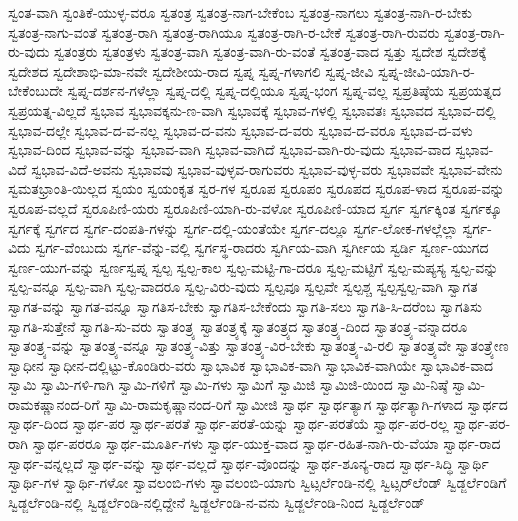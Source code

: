 {ಸ್ವಂತ-ವಾಗಿ
ಸ್ವಂತಿಕೆ-ಯುಳ್ಳ-ವರೂ
ಸ್ವತಂತ್ರ
ಸ್ವತಂತ್ರ-ನಾಗ-ಬೇಕೆಂಬ
ಸ್ವತಂತ್ರ-ನಾಗಲು
ಸ್ವತಂತ್ರ-ನಾಗಿ-ರ-ಬೇಕು
ಸ್ವತಂತ್ರ-ನಾಗು-ವಂತೆ
ಸ್ವತಂತ್ರ-ರಾಗಿ
ಸ್ವತಂತ್ರ-ರಾಗಿಯೂ
ಸ್ವತಂತ್ರ-ರಾಗಿ-ರ-ಬೇಕೆ
ಸ್ವತಂತ್ರ-ರಾಗಿ-ರುವರು
ಸ್ವತಂತ್ರ-ರಾಗಿ-ರು-ವುದು
ಸ್ವತಂತ್ರರು
ಸ್ವತಂತ್ರಳು
ಸ್ವತಂತ್ರ-ವಾಗಿ
ಸ್ವತಂತ್ರ-ವಾಗಿ-ರು-ವಂತೆ
ಸ್ವತಂತ್ರ-ವಾದ
ಸ್ವತ್ತು
ಸ್ವದೇಶ
ಸ್ವದೇಶಕ್ಕೆ
ಸ್ವದೇಶದ
ಸ್ವದೇಶಾಭಿ-ಮಾ-ನವೇ
ಸ್ವದೇಶೀಯ-ರಾದ
ಸ್ವಪ್ನ
ಸ್ವಪ್ನ-ಗಳಾಗಲಿ
ಸ್ವಪ್ನ-ಜೀವಿ
ಸ್ವಪ್ನ-ಜೀವಿ-ಯಾಗಿ-ರ-ಬೇಕೆಂಬುದೇ
ಸ್ವಪ್ನ-ದರ್ಶನ-ಗಳೆಲ್ಲಾ
ಸ್ವಪ್ನ-ದಲ್ಲಿ
ಸ್ವಪ್ನ-ದಲ್ಲಿಯೂ
ಸ್ವಪ್ನ-ಭಂಗ
ಸ್ವಪ್ನ-ವಲ್ಲ
ಸ್ವಪ್ರತಿಷ್ಠೆಯ
ಸ್ವಪ್ರಯತ್ನದ
ಸ್ವಪ್ರಯತ್ನ-ವಿಲ್ಲದೆ
ಸ್ವಭಾವ
ಸ್ವಭಾವಕ್ಕನು-ಣ-ವಾಗಿ
ಸ್ವಭಾವಕ್ಕೆ
ಸ್ವಭಾವ-ಗಳಲ್ಲಿ
ಸ್ವಭಾವತಃ
ಸ್ವಭಾವದ
ಸ್ವಭಾವ-ದಲ್ಲಿ
ಸ್ವಭಾವ-ದಲ್ಲೇ
ಸ್ವಭಾವ-ದ-ವ-ನಲ್ಲ
ಸ್ವಭಾವ-ದ-ವನು
ಸ್ವಭಾವ-ದ-ವರು
ಸ್ವಭಾವ-ದ-ವರೂ
ಸ್ವಭಾವ-ದ-ವಳು
ಸ್ವಭಾವ-ದಿಂದ
ಸ್ವಭಾವ-ವನ್ನು
ಸ್ವಭಾವ-ವಾಗಿ
ಸ್ವಭಾವ-ವಾಗಿದೆ
ಸ್ವಭಾವ-ವಾಗಿ-ರು-ವುದು
ಸ್ವಭಾವ-ವಾದ
ಸ್ವಭಾವ-ವಿದೆ
ಸ್ವಭಾವ-ವಿದೆ-ಅವನು
ಸ್ವಭಾವವು
ಸ್ವಭಾವ-ವುಳ್ಳವ-ರಾಗುವರು
ಸ್ವಭಾವ-ವುಳ್ಳ-ವರು
ಸ್ವಭಾವವೇ
ಸ್ವಭಾವ-ವೇನು
ಸ್ವಮತಭ್ರಾಂತಿ-ಯಿಲ್ಲದ
ಸ್ವಯಂ
ಸ್ವಯಂಕೃತ
ಸ್ವರ-ಗಳ
ಸ್ವರೂಪ
ಸ್ವರೂಪಂ
ಸ್ವರೂಪದ
ಸ್ವರೂಪ-ಳಾದ
ಸ್ವರೂಪ-ವನ್ನು
ಸ್ವರೂಪ-ವಲ್ಲದೆ
ಸ್ವರೂಪಿಣಿ-ಯರು
ಸ್ವರೂಪಿಣಿ-ಯಾಗಿ-ರು-ವಳೋ
ಸ್ವರೂಪಿಣಿ-ಯಾದ
ಸ್ವರ್ಗ
ಸ್ವರ್ಗಕ್ಕಿಂತ
ಸ್ವರ್ಗಕ್ಕೂ
ಸ್ವರ್ಗಕ್ಕೆ
ಸ್ವರ್ಗದ
ಸ್ವರ್ಗ-ದಂಪತಿ-ಗಳನ್ನು
ಸ್ವರ್ಗ-ದಲ್ಲಿ-ಯಂತೆಯೇ
ಸ್ವರ್ಗ-ದಲ್ಲೂ
ಸ್ವರ್ಗ-ಲೋಕ-ಗಳಲ್ಲೆಲ್ಲಾ
ಸ್ವರ್ಗ-ವಿದು
ಸ್ವರ್ಗ-ವೆಂಬುದು
ಸ್ವರ್ಗ-ವೆನ್ನು-ವಲ್ಲಿ
ಸ್ವರ್ಗಸ್ಥ-ರಾದರು
ಸ್ವರ್ಗಿಯ-ವಾಗಿ
ಸ್ವರ್ಗೀಯ
ಸ್ವರ್ಡಿ
ಸ್ವರ್ಣ-ಯುಗದ
ಸ್ವರ್ಣ-ಯುಗ-ವನ್ನು
ಸ್ವರ್ಣಸ್ವಪ್ನ
ಸ್ವಲ್ಪ
ಸ್ವಲ್ಪ-ಕಾಲ
ಸ್ವಲ್ಪ-ಮಟ್ಟಿ-ಗಾ-ದರೂ
ಸ್ವಲ್ಪ-ಮಟ್ಟಿಗೆ
ಸ್ವಲ್ಪ-ಮಪ್ಯಸ್ಯ
ಸ್ವಲ್ಪ-ವನ್ನು
ಸ್ವಲ್ಪ-ವನ್ನೂ
ಸ್ವಲ್ಪ-ವಾಗಿ
ಸ್ವಲ್ಪ-ವಾದರೂ
ಸ್ವಲ್ಪ-ವಿರು-ವುದು
ಸ್ವಲ್ಪವೂ
ಸ್ವಲ್ಪವೇ
ಸ್ವಲ್ಪಶ್ಚ
ಸ್ವಲ್ಪಸ್ವಲ್ಪ-ವಾಗಿ
ಸ್ವಾಗತ
ಸ್ವಾಗತ-ವನ್ನು
ಸ್ವಾಗತ-ವನ್ನೂ
ಸ್ವಾಗತಿಸ-ಬೇಕು
ಸ್ವಾಗತಿಸ-ಬೇಕೆಂದು
ಸ್ವಾಗತಿ-ಸಲು
ಸ್ವಾಗತಿ-ಸಿ-ದರೆಂಬ
ಸ್ವಾಗತಿಸು
ಸ್ವಾಗತಿ-ಸುತ್ತೇನೆ
ಸ್ವಾಗತಿ-ಸು-ವರು
ಸ್ವಾತಂತ್ರ್ಯ
ಸ್ವಾತಂತ್ರ್ಯಕ್ಕೆ
ಸ್ವಾತಂತ್ರ್ಯದ
ಸ್ವಾತಂತ್ರ್ಯ-ದಿಂದ
ಸ್ವಾತಂತ್ರ್ಯ-ವನ್ನಾದರೂ
ಸ್ವಾತಂತ್ರ್ಯ-ವನ್ನು
ಸ್ವಾತಂತ್ರ್ಯ-ವನ್ನೂ
ಸ್ವಾತಂತ್ರ್ಯ-ವಿತ್ತು
ಸ್ವಾತಂತ್ರ್ಯ-ವಿರ-ಬೇಕು
ಸ್ವಾತಂತ್ರ್ಯ-ವಿ-ರಲಿ
ಸ್ವಾತಂತ್ರ್ಯವೇ
ಸ್ವಾತಂತ್ರ್ಯೇಣ
ಸ್ವಾಧೀನ
ಸ್ವಾಧೀನ-ದಲ್ಲಿಟ್ಟು-ಕೊಂಡಿರು-ವರು
ಸ್ವಾಭಾವಿಕ
ಸ್ವಾಭಾವಿಕ-ವಾಗಿ
ಸ್ವಾಭಾವಿಕ-ವಾಗಿಯೇ
ಸ್ವಾಭಾವಿಕ-ವಾದ
ಸ್ವಾಮಿ
ಸ್ವಾಮಿ-ಗಳಿ-ಗಾಗಿ
ಸ್ವಾಮಿ-ಗಳಿಗೆ
ಸ್ವಾಮಿ-ಗಳು
ಸ್ವಾಮಿಗೆ
ಸ್ವಾಮಿಜಿ
ಸ್ವಾಮಿಜಿ-ಯಿಂದ
ಸ್ವಾಮಿ-ನಿಷ್ಠೆ
ಸ್ವಾಮಿ-ರಾಮಕಷ್ಣಾನಂದ-ರಿಗೆ
ಸ್ವಾಮಿ-ರಾಮಕೃಷ್ಣಾನಂದ-ರಿಗೆ
ಸ್ವಾಮೀಜಿ
ಸ್ವಾರ್ಥ
ಸ್ವಾರ್ಥತ್ಯಾಗ
ಸ್ವಾರ್ಥತ್ಯಾಗಿ-ಗಳಾದ
ಸ್ವಾರ್ಥದ
ಸ್ವಾರ್ಥ-ದಿಂದ
ಸ್ವಾರ್ಥ-ಪರ
ಸ್ವಾರ್ಥ-ಪರತೆ
ಸ್ವಾರ್ಥ-ಪರತೆ-ಯನ್ನು
ಸ್ವಾರ್ಥ-ಪರತೆಯೆ
ಸ್ವಾರ್ಥ-ಪರ-ರಲ್ಲ
ಸ್ವಾರ್ಥ-ಪರ-ರಾಗಿ
ಸ್ವಾರ್ಥ-ಪರರೂ
ಸ್ವಾರ್ಥ-ಮೂರ್ತಿ-ಗಳು
ಸ್ವಾರ್ಥ-ಯುಕ್ತ-ವಾದ
ಸ್ವಾರ್ಥ-ರಹಿತ-ನಾಗಿ-ರು-ವೆಯಾ
ಸ್ವಾರ್ಥ-ರಾದ
ಸ್ವಾರ್ಥ-ವನ್ನಲ್ಲದೆ
ಸ್ವಾರ್ಥ-ವನ್ನು
ಸ್ವಾರ್ಥ-ವಲ್ಲದೆ
ಸ್ವಾರ್ಥ-ವೊಂದನ್ನು
ಸ್ವಾರ್ಥ-ಶೂನ್ಯ-ರಾದ
ಸ್ವಾರ್ಥ-ಸಿದ್ಧಿ
ಸ್ವಾರ್ಥಿ
ಸ್ವಾರ್ಥಿ-ಗಳ
ಸ್ವಾರ್ಥಿ-ಗಳೋ
ಸ್ವಾವಲಂಬಿ-ಗಳು
ಸ್ವಾವಲಂಬಿ-ಯಾಗು
ಸ್ವಿಟ್ಸರ್ಲೆಂಡಿ-ನಲ್ಲಿ
ಸ್ವಿಟ್ಸರ್‌ಲೆಂಡ್
ಸ್ವಿಡ್ಜರ್ಲೆಂಡಿಗೆ
ಸ್ವಿಡ್ಜರ್ಲೆಂಡಿ-ನಲ್ಲಿ
ಸ್ವಿಡ್ಜರ್ಲೆಂಡಿ-ನಲ್ಲಿದ್ದೇನೆ
ಸ್ವಿಡ್ಜರ್ಲೆಂಡಿ-ನ-ವನು
ಸ್ವಿಡ್ಜರ್ಲೆಂಡಿ-ನಿಂದ
ಸ್ವಿಡ್ಜರ್ಲೆಂಡ್
}
